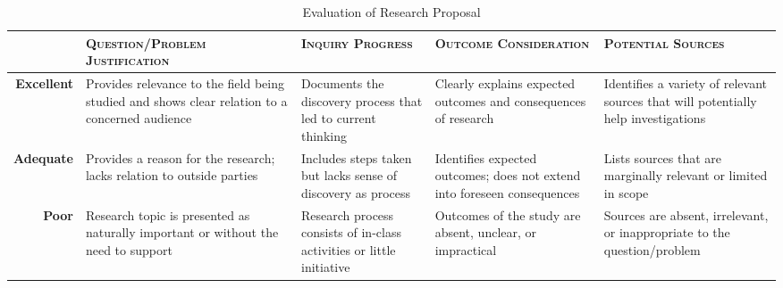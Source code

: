 \documentclass[12pt, twosides]{amsart}	%
\begin{document}
\begin{table}[b]
	\caption{Evaluation of Research Proposal}\label{tab:rubric}
	\small
\begin{tabulary}{\textwidth}{rLLLL}
	\toprule  & \textbf{\textsc{Question/Problem Justification}} & \textbf{\textsc{Inquiry Progress}} & \textbf{\textsc{Outcome Consideration}} & \textbf{\textsc{Potential Sources}}\\
\midrule	\textbf{Excellent} & Provides relevance to the field being studied and shows clear relation to a concerned audience & Documents the discovery process that led to current thinking & Clearly explains expected outcomes and consequences of research & Identifies a variety of relevant sources that will potentially help investigations \\
\midrule	\textbf{Adequate} & Provides a reason for the research; lacks relation to outside parties & Includes steps taken but lacks sense of discovery as process & Identifies expected outcomes; does not extend into foreseen consequences & Lists sources that are marginally relevant or limited in scope \\
\midrule	\textbf{Poor} & Research topic is presented as naturally important or without the need to support & Research process consists of in-class activities or little initiative & Outcomes of the study are absent, unclear, or impractical & Sources are absent, irrelevant, or inappropriate to the question/problem \\
	\bottomrule
\end{tabulary}
\end{table}
\end{document}
